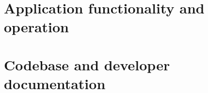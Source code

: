 \documentclass[english,10pt,a4paper,titlepage]{scrartcl}
\begin{document}
\maketitle

\clearpage
{\footnotesize{}\tableofcontents}
\clearpage
\part{Application functionality and operation}

\clearpage
\part{Codebase and developer documentation}

\clearpage
\appendix

\end{document}
